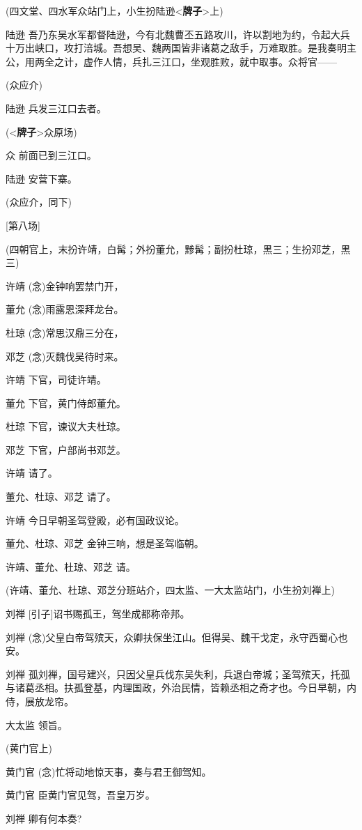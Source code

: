 (四文堂、四水军众站门上，小生扮陆逊\textless{}\textbf{牌子}\textgreater{}上)

陆逊
吾乃东吴水军都督陆逊，今有北魏曹丕五路攻川，许以割地为约，令起大兵十万出峡口，攻打涪城。吾想吴、魏两国皆非诸葛之敌手，万难取胜。是我奏明主公，用两全之计，虚作人情，兵扎三江口，坐观胜败，就中取事。众将官------

(众应介)

陆逊 兵发三江口去者。

(\textless{}\textbf{牌子}\textgreater{}众原场)

众 前面已到三江口。

陆逊 安营下寨。

(众应介，同下)

{[}第八场{]}

(四朝官上，末扮许靖，白髯；外扮董允，黪髯；副扮杜琼，黑三；生扮邓芝，黑三)

许靖 (念)金钟响罢禁门开，

董允 (念)雨露恩深拜龙台。

杜琼 (念)常思汉鼎三分在，

邓芝 (念)灭魏伐吴待时来。

许靖 下官，司徒许靖。

董允 下官，黄门侍郎董允。

杜琼 下官，谏议大夫杜琼。

邓芝 下官，户部尚书邓芝。

许靖 请了。

董允、杜琼、邓芝 请了。

许靖 今日早朝圣驾登殿，必有国政议论。

董允、杜琼、邓芝 金钟三响，想是圣驾临朝。

许靖、董允、杜琼、邓芝 请。

(许靖、董允、杜琼、邓芝分班站介，四太监、一大太监站门，小生扮刘禅上)

刘禅 {[}引子{]}诏书赐孤王，驾坐成都称帝邦。

刘禅
(念)父皇白帝驾殡天，众卿扶保坐江山。但得吴、魏干戈定，永守西蜀心也安。

刘禅
孤刘禅，国号建兴，只因父皇兵伐东吴失利，兵退白帝城；圣驾殡天，托孤与诸葛丞相。扶孤登基，内理国政，外治民情，皆赖丞相之奇才也。今日早朝，内侍，展放龙帘。

大太监 领旨。

(黄门官上)

黄门官 (念)忙将动地惊天事，奏与君王御驾知。

黄门官 臣黄门官见驾，吾皇万岁。

刘禅 卿有何本奏?


